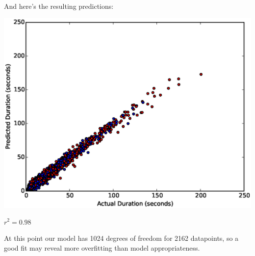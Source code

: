         \vspace{1.5in}

        And here's the resulting predictions:
        
\includegraphics[width=\textwidth]{part11scatter5mer}

$r^2=0.98$



At this point our model has 1024 degrees of freedom for 2162 datapoints, so a good fit may reveal more overfitting than model appropriateness.
